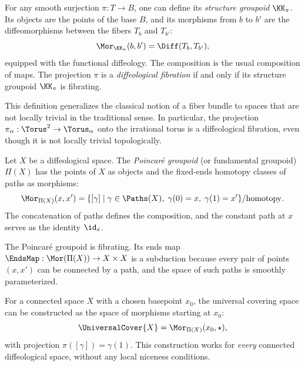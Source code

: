 \begin{article}
  For any smooth surjection $\pi: T \to B$,
  one can define its \emph{structure groupoid} $\KK_\pi$.
  Its objects are the points of the base $B$,
  and its morphisms from $b$ to $b'$ are the diffeomorphisms between the fibers $T_b$ and $T_{b'}$:
  \[
    \Mor_{\KK_\pi}(b,b') = \Diff(T_b, T_{b'}),
    \]
  equipped with the functional diffeology.
  The composition is the usual composition of maps.
  The projection $\pi$ is a \emph{diffeological fibration} if and only if its structure groupoid $\KK_\pi$ is fibrating.
  
  This definition generalizes the classical notion of a fiber bundle to spaces that are not locally trivial in the traditional sense.
  In particular,
  the projection $\pi_\alpha: \Torus^2 \to \Torus_\alpha$ onto the irrational torus
  is a diffeological fibration,
  even though it is not locally trivial topologically.
\end{article}

\begin{article}
  Let $X$ be a diffeological space.
  The \emph{Poincaré groupoid} (or fundamental groupoid) $\Pi(X)$ has the points of $X$ as objects
  and the fixed-ends homotopy classes of paths as morphisms:
  \[
    \Mor_{\Pi(X)}(x,x') = \{ [\gamma] \mid \gamma \in \Paths(X), \; \gamma(0)=x,\; \gamma(1)=x' \}/\text{homotopy}.
    \]
  The concatenation of paths defines the composition,
  and the constant path at $x$ serves as the identity $\id_x$.
  
  The Poincaré groupoid is fibrating.
  Its ends map $\EndsMap: \Mor(\Pi(X)) \to X \times X$ is a subduction because every pair of points $(x,x')$
  can be connected by a path,
  and the space of such paths is smoothly parameterized.
  
  For a connected space $X$ with a chosen basepoint $x_0$,
  the universal covering space can be constructed as the space of morphisms starting at $x_0$:
  \[
    \UniversalCover{X} = \Mor_{\Pi(X)}(x_0, \star),
    \]
  with projection $\pi([\gamma]) = \gamma(1)$.
  This construction works for \emph{every} connected diffeological space,
  without any local niceness conditions.
\end{article}

